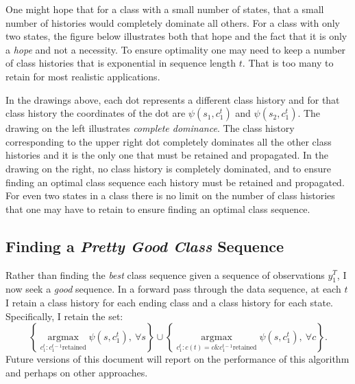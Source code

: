 \documentclass[prelim,showlabels]{book}
\newcommand{\argmax}{\operatorname*{argmax}}
\begin{document}
One might hope that for a class with a small number of states, that a
small number of histories would completely dominate all others.  For a
class with only two states, the figure below illustrates both that
hope and the fact that it is only a \emph{hope} and not a necessity.
To ensure optimality one may need to keep a number of class histories
that is exponential in sequence length $t$.  That is too many to
retain for most realistic applications.

\begin{center}
  \parbox{0.9\textwidth}{ In the drawings above, each dot represents a
    different class history and for that class history the coordinates
    of the dot are $\psi(s_1, c_1^t)$ and $\psi(s_2, c_1^t)$.  The
    drawing on the left illustrates \emph{complete dominance}.  The
    class history corresponding to the upper right dot completely
    dominates all the other class histories and it is the only one
    that must be retained and propagated.  In the drawing on the
    right, no class history is completely dominated, and to ensure
    finding an optimal class sequence each history must be retained
    and propagated.  For even two states in a class there is no limit
    on the number of class histories that one may have to retain to
    ensure finding an optimal class sequence.}
\end{center}

\subsection{Finding a \emph{Pretty Good Class} Sequence}
\label{sec:prettygood}

Rather than finding the \emph{best} class sequence given a sequence of
observations $y_1^T$, I now seek a \emph{good} sequence.  In a forward pass
through the data sequence, at each $t$ I retain a class history for
each ending class and a class history for each state.  Specifically, I
retain the set:
\begin{equation*}
  \left\{ \argmax_{c_1^t:c_1^{t-1}\text{retained}}
    \psi(s,c_1^t), ~ \forall s \right\} \cup
  \left\{ \argmax_{c_1^t:c(t)=c\& c_1^{t-1}\text{retained}}
    \psi(s,c_1^t), ~ \forall c \right\}.
\end{equation*}
Future versions of this document will report on the performance of
this algorithm and perhaps on other approaches.
\end{document}
